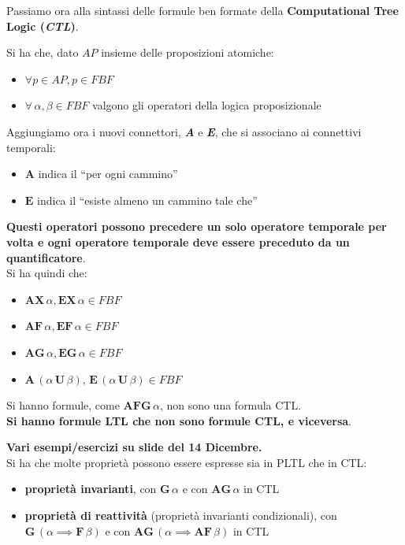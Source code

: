 Passiamo ora alla sintassi delle formule ben formate della \textbf{Computational
  Tree Logic (\textit{CTL})}.
\begin{definizione}
  Si ha che, dato $AP$ insieme delle proposizioni atomiche:
  \begin{itemize}
    \item $\forall p\in AP, p\in FBF$
    \item $\forall\,\alpha,\beta\in FBF$ valgono gli operatori della logica
    proposizionale 
  \end{itemize}
  Aggiungiamo ora i nuovi connettori, \textbf{\textit{A}} e \textit{\textbf{E}},
  che si associano ai connettivi temporali:
  \begin{itemize}
    \item $\mathbf{A}$ indica il ``per ogni cammino''
    \item $\mathbf{E}$ indica il ``esiste almeno un cammino tale che''
  \end{itemize}
  \textbf{Questi operatori possono precedere un solo operatore temporale per
    volta e ogni operatore temporale deve essere preceduto da un
    quantificatore}.\\ 
  Si ha quindi che:
  \begin{itemize}
    \item $\mathbf{AX}\,\alpha,\mathbf{EX}\,\alpha\in FBF$
    \item $\mathbf{AF}\,\alpha,\mathbf{EF}\,\alpha\in FBF$
    \item $\mathbf{AG}\,\alpha,\mathbf{EG}\,\alpha\in FBF$
    \item $\mathbf{A}\,(\alpha\,\mathbf{U}\,\beta),\,\mathbf{E}\,
    (\alpha\,\mathbf{U}\,\beta)\in FBF$    
  \end{itemize}
  Si hanno formule, come $\mathbf{AFG}\,\alpha$, non sono una formula CTL. \\
 \textbf{Si hanno formule LTL che non sono formule CTL, e viceversa}.
\end{definizione}
\textbf{Vari esempi/esercizi su slide del 14 Dicembre.}\\
Si ha che molte proprietà possono essere espresse sia in PLTL che in CTL:
\begin{itemize}
  \item \textbf{proprietà invarianti}, con $\mathbf{G}\,\alpha$ e con
  $\mathbf{AG}\,\alpha$ in CTL
  \item \textbf{proprietà di reattività} (proprietà invarianti condizionali),
  con $\mathbf{G}\,(\alpha\implies \mathbf{F}\,\beta)$ e con
  $\mathbf{AG}\,(\alpha\implies \mathbf{AF}\,\beta)$ in CTL
\end{itemize}
